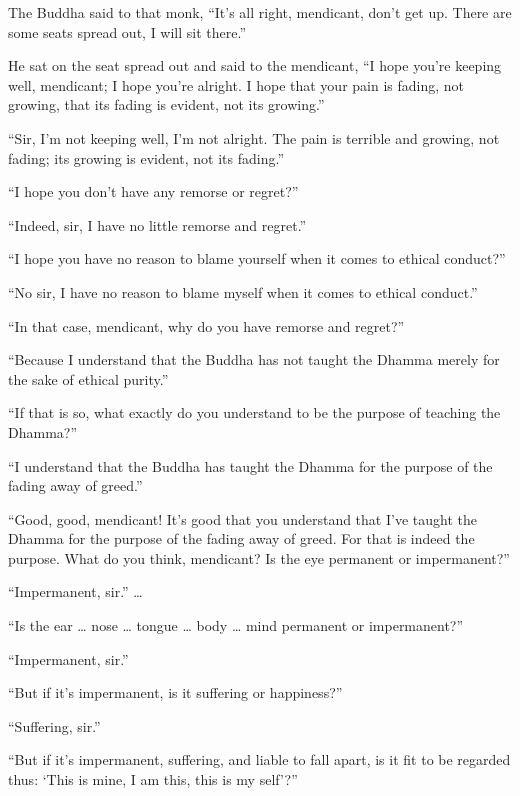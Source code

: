 \documentclass[12pt,openany]{book}%
\begin{document}
The Buddha said to that monk, “It’s all right, mendicant, don’t get up. There are some seats spread out, I will sit there.” 

He sat on the seat spread out and said to the mendicant, “I hope you’re keeping well, mendicant; I hope you’re alright. I hope that your pain is fading, not growing, that its fading is evident, not its growing.” 

“Sir, I’m not keeping well, I’m not alright. The pain is terrible and growing, not fading; its growing is evident, not its fading.” 

“I hope you don’t have any remorse or regret?” 

“Indeed, sir, I have no little remorse and regret.” 

“I hope you have no reason to blame yourself when it comes to ethical conduct?” 

“No sir, I have no reason to blame myself when it comes to ethical conduct.” 

“In that case, mendicant, why do you have remorse and regret?” 

“Because I understand that the Buddha has not taught the Dhamma merely for the sake of ethical purity.” 

“If that is so, what exactly do you understand to be the purpose of teaching the Dhamma?” 

“I understand that the Buddha has taught the Dhamma for the purpose of the fading away of greed.” 

“Good, good, mendicant! It’s good that you understand that I’ve taught the Dhamma for the purpose of the fading away of greed. For that is indeed the purpose. What do you think, mendicant? Is the eye permanent or impermanent?” 

“Impermanent, sir.” … 

“Is the ear … nose … tongue … body … mind permanent or impermanent?” 

“Impermanent, sir.” 

“But if it’s impermanent, is it suffering or happiness?” 

“Suffering, sir.” 

“But if it’s impermanent, suffering, and liable to fall apart, is it fit to be regarded thus: ‘This is mine, I am this, this is my self’?” 
\end{document}
